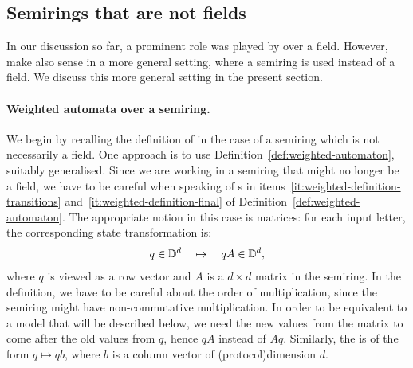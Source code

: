 
\subsection{Semirings that are not fields}
\label{sec:beyond-fields}
In our discussion so far, a prominent role was played by  over a field. However,  make also sense in a more general setting, where a semiring is used instead of a field. We discuss this more general setting in the present section.

\paragraph*{Weighted automata over a semiring.}
We begin by recalling the definition  of   in the case of a semiring which is not necessarily a field. One approach is to use Definition~\ref{def:weighted-automaton}, suitably generalised. Since we are working in a semiring that might no longer be a field, we have to be careful when speaking of s in items~\ref{it:weighted-definition-transitions} and~\ref{it:weighted-definition-final} of Definition~\ref{def:weighted-automaton}. The appropriate notion in this case is matrices: for each input letter, the corresponding state transformation is: 
\begin{align*}
q \in \mathbb D^d \quad \mapsto \quad qA \in \mathbb D^d,
\end{align*}
where $q$ is viewed as a row vector and $A$ is a $d \times d$ matrix in the semiring. In the definition, we have to be careful about the order of multiplication, since the semiring might have non-commutative multiplication. In order to be equivalent to a model that will be described below,  we need the new values from the matrix to come after the old values from $q$, hence $qA$ instead of $Aq$.  Similarly, the  is of the form $q \mapsto q b$, where $b$ is a column vector of \kl(protocol){dimension} $d$.


